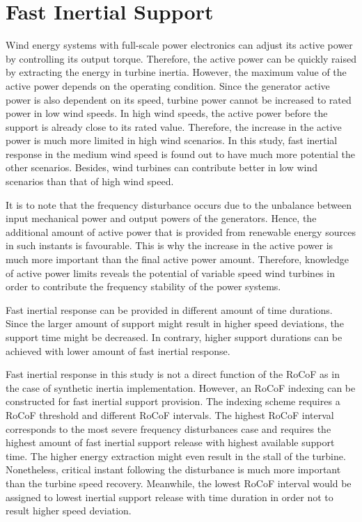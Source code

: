 \section{Fast Inertial Support}
Wind energy systems with full-scale power electronics can adjust its active power by controlling its output torque. Therefore, the active power can be quickly raised by extracting the energy in turbine inertia. However, the maximum value of the active power depends on the operating condition. Since the generator active power is also dependent on its speed, turbine power cannot be increased to rated power in low wind speeds. In high wind speeds, the active power before the support is already close to its rated value. Therefore, the increase in the active power is much more limited in high wind scenarios. In this study, fast inertial response in the medium wind speed is found out to have much more potential the other scenarios. Besides, wind turbines can contribute better in low wind scenarios than that of high wind speed.\par
It is to note that the frequency disturbance occurs due to the unbalance between input mechanical power and output powers of the generators. Hence, the additional amount of active power that is provided from renewable energy sources in such instants is favourable. This is why the increase in the active power is much more important than the final active power amount. Therefore, knowledge of active power limits reveals the potential of variable speed wind turbines in order to contribute the frequency stability of the power systems.\par
Fast inertial response can be provided in different amount of time durations. Since the larger amount of support might result in higher speed deviations, the support time might be decreased. In contrary, higher support durations can be achieved with lower amount of fast inertial response.\par
Fast inertial response in this study is not a direct function of the RoCoF as in the case of synthetic inertia implementation. However, an RoCoF indexing can be constructed for fast inertial support provision. The indexing scheme requires a RoCoF threshold and different RoCoF intervals. The highest RoCoF interval corresponds to the most severe frequency disturbances case and requires the highest amount of fast inertial support release with highest available support time. The higher energy extraction might even result in the stall of the turbine. Nonetheless, critical instant following the disturbance is much more important than the turbine speed recovery. Meanwhile, the lowest RoCoF interval would be assigned to lowest inertial support release with time duration in order not to result higher speed deviation. 
